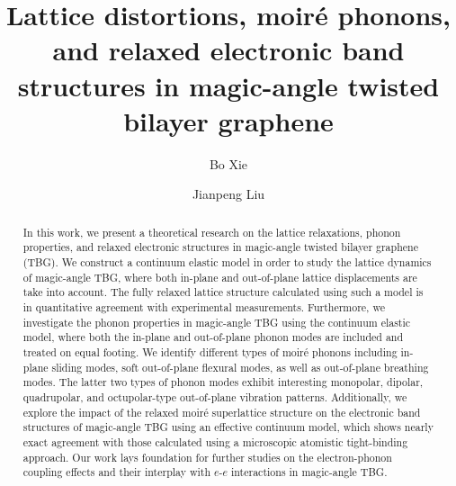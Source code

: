 \documentclass[aps,prx,10pt,twocolumn,superscriptaddress]{revtex4}
\begin{document}
\title{Lattice distortions, moir\'e phonons, and relaxed electronic band structures in magic-angle twisted bilayer graphene}%

\author{Bo Xie}
%
 
\author{Jianpeng Liu}
%
\begin{abstract}
In this work, we present a theoretical research on the lattice relaxations, phonon properties, and relaxed electronic structures in magic-angle  twisted bilayer graphene (TBG). We construct a continuum elastic model in order to study the lattice dynamics of magic-angle TBG, where both in-plane and out-of-plane lattice displacements are take into account.  The fully relaxed lattice structure calculated using such a model is in quantitative agreement with experimental measurements. Furthermore, we investigate the phonon properties in magic-angle TBG using the continuum elastic model, where both the in-plane and out-of-plane phonon modes are included and treated on equal footing. We identify different types of moir\'e phonons including  in-plane sliding modes, soft out-of-plane flexural modes, as well as out-of-plane breathing modes. The latter two types of phonon modes exhibit interesting monopolar, dipolar, quadrupolar, and octupolar-type out-of-plane vibration patterns. Additionally, we explore the impact of the relaxed moir\'e superlattice structure on the electronic band structures of magic-angle TBG using an effective continuum model, which shows nearly exact agreement with those calculated using a  microscopic atomistic tight-binding approach. Our work lays foundation for further studies on the electron-phonon coupling effects and their interplay with $e$-$e$ interactions in magic-angle TBG.
\end{abstract}
             
\maketitle
\end{document}
